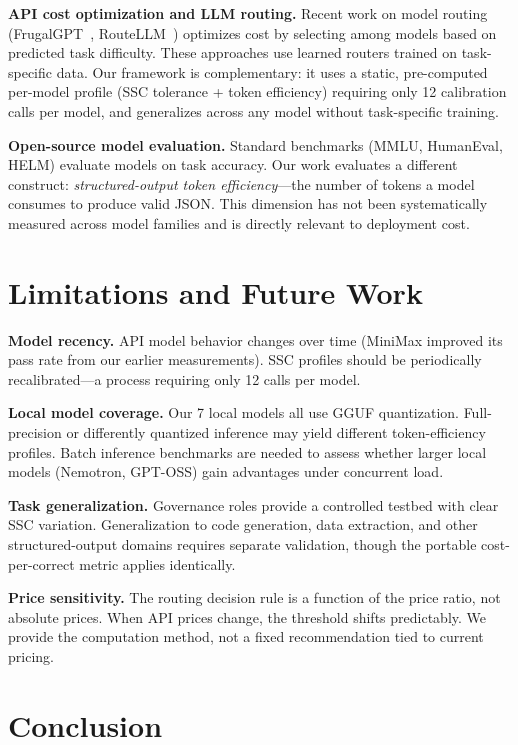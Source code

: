 \documentclass[11pt,a4paper]{article}
\begin{document}
\textbf{API cost optimization and LLM routing.} Recent work on model routing (FrugalGPT~\cite{frugalgpt}, RouteLLM~\cite{routellm}) optimizes cost by selecting among models based on predicted task difficulty. These approaches use learned routers trained on task-specific data. Our framework is complementary: it uses a static, pre-computed per-model profile (SSC tolerance + token efficiency) requiring only 12 calibration calls per model, and generalizes across any model without task-specific training.

\textbf{Open-source model evaluation.} Standard benchmarks (MMLU, HumanEval, HELM) evaluate models on task accuracy. Our work evaluates a different construct: \textit{structured-output token efficiency}---the number of tokens a model consumes to produce valid JSON. This dimension has not been systematically measured across model families and is directly relevant to deployment cost.

\section{Limitations and Future Work}

\textbf{Model recency.} API model behavior changes over time (MiniMax improved its pass rate from our earlier measurements). SSC profiles should be periodically recalibrated---a process requiring only 12 calls per model.

\textbf{Local model coverage.} Our 7 local models all use GGUF quantization. Full-precision or differently quantized inference may yield different token-efficiency profiles. Batch inference benchmarks are needed to assess whether larger local models (Nemotron, GPT-OSS) gain advantages under concurrent load.

\textbf{Task generalization.} Governance roles provide a controlled testbed with clear SSC variation. Generalization to code generation, data extraction, and other structured-output domains requires separate validation, though the portable cost-per-correct metric applies identically.

\textbf{Price sensitivity.} The routing decision rule is a function of the price ratio, not absolute prices. When API prices change, the threshold shifts predictably. We provide the computation method, not a fixed recommendation tied to current pricing.

\section{Conclusion}
\end{document}
